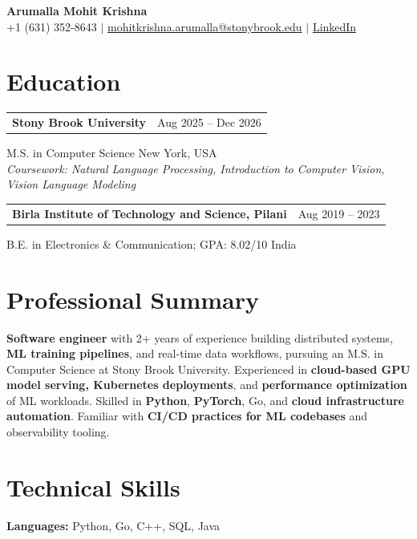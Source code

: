 \documentclass[letterpaper,10pt]{article}
\makeatletter
\newcommand{\entry}[2]{%
  \noindent
  \begin{tabularx}{\linewidth}
    {@{}>{\raggedright\arraybackslash}X@{\hspace{6pt}}r@{}}
    \textbf{#1} & #2
  \end{tabularx}\par
}
\makeatother
\begin{document}
\begin{center}
    {\LARGE\bfseries Arumalla Mohit Krishna}\\[3pt]
    +1 (631) 352-8643 $|$
    \href{mailto:mohitkrishna.arumalla@stonybrook.edu}
    {mohitkrishna.arumalla@stonybrook.edu} $|$
    \href{https://linkedin.com/in/mohit-krishna-arumalla}
    {LinkedIn}
\end{center}
\vspace{-8pt}

\section{Education}

\entry
  {\textbf{Stony Brook University}}
  {Aug 2025 -- Dec 2026}

M.S. in Computer Science \hfill New York, USA\\
\textit{
Coursework: Natural Language Processing,
Introduction to Computer Vision, Vision Language Modeling
}
\vspace{3pt}

\entry
  {\textbf{Birla Institute of Technology and Science, Pilani}}
  {Aug 2019 -- 2023}

B.E. in Electronics \& Communication; GPA: 8.02/10 \hfill India
\section{Professional Summary}

\textbf{Software engineer} with 2+ years of experience building distributed systems, \textbf{ML training pipelines}, and real-time data workflows, pursuing an M.S. in Computer Science at Stony Brook University. Experienced in \textbf{cloud-based GPU model serving, Kubernetes deployments}, and \textbf{performance optimization} of ML workloads. Skilled in \textbf{Python}, \textbf{PyTorch}, Go, and \textbf{cloud infrastructure automation}. Familiar with \textbf{CI/CD practices for ML codebases} and observability tooling.

\section{Technical Skills}

\textbf{Languages:}
Python, Go, C++, SQL, Java\\
\end{document}

